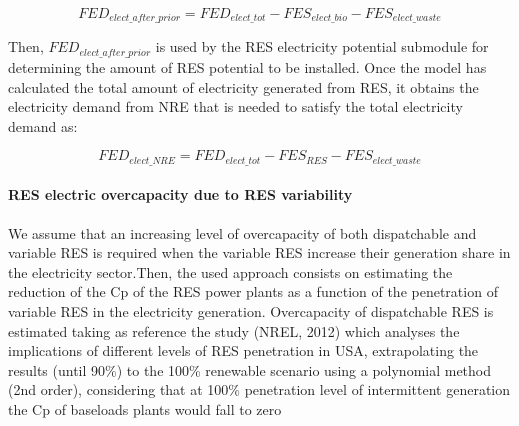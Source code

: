 \begin{equation}
    FED_{elect\_after\_prior}= FED_{elect\_tot}-FES_{elect\_bio}-FES_{elect\_waste}
\end{equation}

Then, $FED_{elect\_after\_prior}$ is used by the RES electricity potential submodule for determining the amount of RES potential to be installed.
Once the model has calculated the total amount of electricity generated from RES, it obtains the electricity demand from NRE that is needed to satisfy the total electricity demand as:

\begin{equation}
    FED_{elect\_NRE}= FED_{elect\_tot}-FES_{RES}-FES_{elect\_waste}
\end{equation}

\paragraph{RES electric overcapacity due to RES variability}

We assume that an increasing level of overcapacity of both dispatchable and variable RES is required when the variable RES increase their generation share in the electricity sector.Then, the used approach consists on estimating the reduction of the Cp of the RES power plants as a function of the penetration of variable RES in the electricity generation.
Overcapacity of dispatchable RES is estimated taking as reference the study (NREL, 2012) which analyses the implications of different levels of RES penetration in USA, extrapolating the results (until 90\%) to the 100\% renewable scenario using a polynomial method (2nd order), considering that at 100\% penetration level of intermittent generation the Cp of baseloads plants would fall to zero
